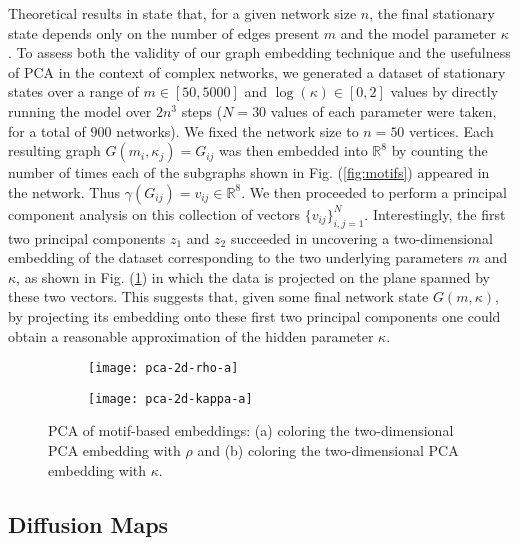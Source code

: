   Theoretical results in \cite{rath_time_2012} state that, for a given
  network size $n$, the final stationary state depends only on the
  number of edges present $m$ and the model parameter $\kappa$.
  To assess both the validity of our graph embedding technique and the
  usefulness of PCA in the context of complex networks, we generated a
  dataset of stationary states over a range of $m \in [50, 5000]$ and
  $\log(\kappa) \in [0, 2]$ values by directly running the model over
  $2n^3$ steps ($N=30$ values of each parameter were taken, for a
  total of $900$ networks).
  We fixed the network size to $n=50$ vertices.
  Each resulting graph $G(m_i, \kappa_j) = G_{ij}$ was then embedded
  into $\mathbb{R}^8$ by counting the number of times each of the
  subgraphs shown in Fig. (\ref{fig:motifs}) appeared in the network.
  Thus $\gamma(G_{ij}) = v_{ij} \in \mathbb{R}^8$.
  We then proceeded to perform a principal component analysis on this
  collection of vectors $\{v_{ij}\}_{i,j=1}^N$.
  Interestingly, the first two principal components $z_1$ and $z_2$
  succeeded in uncovering a two-dimensional embedding of the dataset
  corresponding to the two underlying parameters $m$ and $\kappa$, as
  shown in Fig. (\ref{fig:pca}) in which the data is projected on the
  plane spanned by these two vectors.
  This suggests that, given some final network state $G(m, \kappa)$,
  by projecting its embedding onto these first two principal
  components one could obtain a reasonable approximation of the hidden
  parameter $\kappa$.

  \begin{figure}
    \vspace{-5mm} \centering
    \begin{subfigure}{0.49\textwidth}
      \centering
      \texttt{[image: pca-2d-rho-a]}
      \subcaption{\label{fig:pca-rho}}
    \end{subfigure} %
    \begin{subfigure}{0.49\textwidth}
      \centering
      \texttt{[image: pca-2d-kappa-a]}
      \subcaption{\label{fig:pca-kappa}}
    \end{subfigure}%
    \caption[Principal component analysis of motif-based
    embeddings]{PCA of motif-based embeddings: (a) coloring the
      two-dimensional PCA embedding with $\rho$ and (b) coloring the
      two-dimensional PCA embedding with $\kappa$. \label{fig:pca}}
  \end{figure}

  \subsection{Diffusion Maps}

